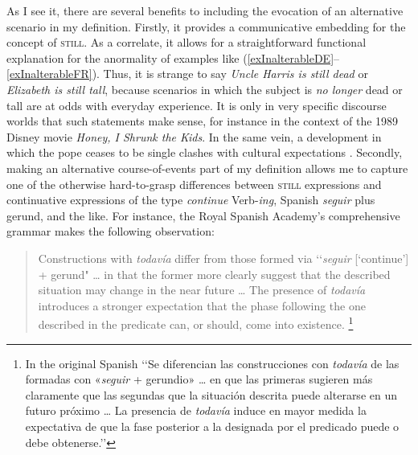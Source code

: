 As I see it, there are several benefits to including the evocation of an alternative scenario in my definition.  Firstly, it provides a communicative embedding for the concept of \textsc{still}. As a correlate, it allows for a straightforward functional explanation for the anormality of examples like (\ref{exInalterableDE}–\ref{exInalterableFR}). Thus, it is strange to say \textit{Uncle Harris is still dead} or \textit{Elizabeth is still tall}, because scenarios in which the subject is \textit{no longer} dead or tall are at odds with everyday experience. It is only in very specific discourse worlds that such statements make sense, for instance in the context of the 1989 Disney movie \textit{Honey, I Shrunk the Kids}. In the same vein, a development in which the pope ceases to be single clashes with cultural expectations \parencite[117–118]{MosegaardHansen2008}. Secondly, making an alternative course-of-events part of my definition allows me to capture one of the otherwise hard-to-grasp differences between \textsc{still} expressions and continuative expressions of the type \textit{continue} Verb-\textit{ing}, Spanish \textit{seguir} plus gerund, and the like. For instance, the Royal Spanish Academy's comprehensive grammar makes the following observation:

\begin{quote}
Constructions with \textit{todavía} differ from those formed via \lq\lq \textit{seguir} [\lq continue\rq] + gerund" … in that the former more clearly suggest that the described situation may change in the near future … The presence of \textit{todavía} introduces a stronger expectation that the phase following the one described in the predicate can, or should, come into existence. \parencite[§30.8i]{RAEGramatica}\footnote{In the original Spanish \lq\lq Se diferencian las construcciones con \textit{todavía} de las formadas con «\textit{seguir} + gerundio» … en que las primeras sugieren más claramente que las segundas que la situación descrita puede alterarse en un futuro próximo  … La presencia de \textit{todavía} induce en mayor medida la expectativa de que la fase posterior a la designada por el predicado puede o debe obtenerse.\rq\rq{}}
\end{quote}

